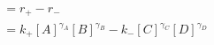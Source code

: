 \begin{eqnarray}\label{eqn:flux-def}
\ & =r_+-r_- \\
&=  k_+[A]^{\gamma_A}[B]^{\gamma_B} -  k_-[C]^{\gamma_C}[D]^{\gamma_D} \\
\end{eqnarray}